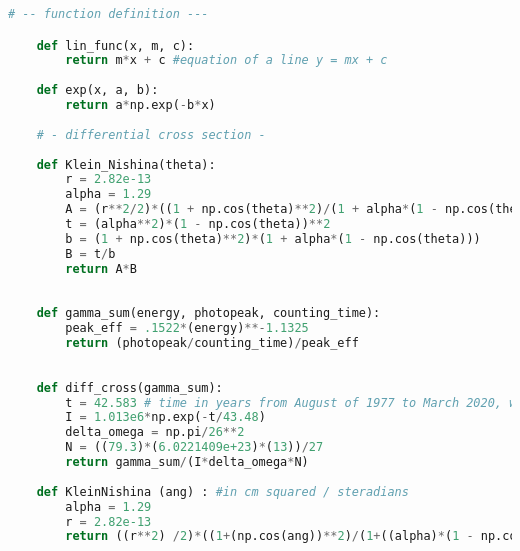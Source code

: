 \begin{lstlisting}[language = Python, frame = single, caption = {Function defintion}]
    # -- function definition --- 

    def lin_func(x, m, c):
        return m*x + c #equation of a line y = mx + c 
    
    def exp(x, a, b):
        return a*np.exp(-b*x)
    
    # - differential cross section - 
    
    def Klein_Nishina(theta):
        r = 2.82e-13
        alpha = 1.29
        A = (r**2/2)*((1 + np.cos(theta)**2)/(1 + alpha*(1 - np.cos(theta)**2)))
        t = (alpha**2)*(1 - np.cos(theta))**2
        b = (1 + np.cos(theta)**2)*(1 + alpha*(1 - np.cos(theta)))
        B = t/b
        return A*B 
    
    
    def gamma_sum(energy, photopeak, counting_time):
        peak_eff = .1522*(energy)**-1.1325
        return (photopeak/counting_time)/peak_eff
        
    
    def diff_cross(gamma_sum):
        t = 42.583 # time in years from August of 1977 to March 2020, when data was taken. 
        I = 1.013e6*np.exp(-t/43.48) 
        delta_omega = np.pi/26**2
        N = ((79.3)*(6.0221409e+23)*(13))/27
        return gamma_sum/(I*delta_omega*N)
    
    def KleinNishina (ang) : #in cm squared / steradians
        alpha = 1.29
        r = 2.82e-13
        return ((r**2) /2)*((1+(np.cos(ang))**2)/(1+((alpha)*(1 - np.cos(ang))))**2)*(1+( (alpha**2)*((1 - np.cos(ang))**2) /(  (np.cos(ang))**2)*(1+((alpha)*(1 - np.cos(ang))))))
\end{lstlisting}


    
    
    
    
    
    
